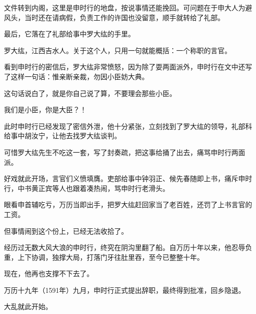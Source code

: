 \begin{multicols}{\theparacolNo}
文件转到内阁，这里是申时行的地盘，按说事情还能挽回。可问题在于申大人为避风头，当时还在请病假，负责工作的许国也没留意，顺手就转给了礼部。

最后，它落在了礼部给事中罗大纮的手里。

罗大纮，江西吉水人。关于这个人，只用一句就能概括：一个称职的言官。

看到申时行的密信后，罗大纮非常愤怒，因为除了耍两面派外，申时行在文中还写了这样一句话：惟亲断亲裁，勿因小臣妨大典。

这句话说白了，就是你自己说了算，不要理会那些小臣。

我们是小臣，你是大臣？！

此时申时行已经发现了密信外泄，他十分紧张，立刻找到了罗大纮的领导，礼部科给事中胡汝宁，让他去找罗大纮谈判。

可惜罗大纮先生不吃这一套，写了封奏疏，把这事给捅了出去，痛骂申时行两面派。

好戏就此开场，言官们义愤填膺。吏部给事中钟羽正、候先春随即上书，痛斥申时行，中书黄正宾等人也跟着凑热闹，骂申时行老滑头。

眼看申首辅吃亏，万历当即出手，把罗大纮赶回家当了老百姓，还罚了上书言官的工资。

但事情闹到这个份上，已经无法收拾了。

经历过无数大风大浪的申时行，终究在阴沟里翻了船。自万历十年以来，他忍辱负重，上下协调，独撑大局，打落门牙往肚里吞，至今已整整十年。

现在，他再也支撑不下去了。

万历十九年（1591年）九月，申时行正式提出辞职，最终得到批准，回乡隐退。

大乱就此开始。

\ifnum{}
	\end{multicols}
\fi
\newpage
